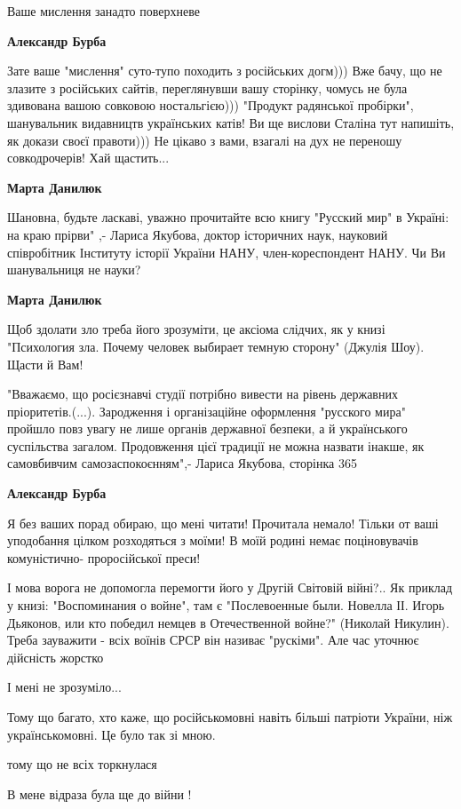 \begin{itemize}
\begin{itemize}
\begin{itemize}
Ваше мислення занадто поверхневе

\textbf{Александр Бурба} 

Зате ваше "мислення" суто-тупо походить з російських догм))) Вже бачу, що не
злазите з російських сайтів, переглянувши вашу сторінку, чомусь не була
здивована вашою совковою ностальгією))) "Продукт радянської пробірки",
шанувальник видавництв українських катів! Ви ще вислови Сталіна тут напишіть,
як докази своєї правоти))) Не цікаво з вами, взагалі на дух не переношу
совкодрочерів! Хай щастить...

\textbf{Марта Данилюк} 

Шановна, будьте ласкаві, уважно прочитайте всю книгу "Русский мир" в Україні:
на краю прірви" ,- Лариса Якубова, доктор історичних наук, науковий
співробітник Інституту історії України НАНУ, член-кореспондент НАНУ. Чи Ви
шанувальниця не науки?


\textbf{Марта Данилюк} 

Щоб здолати зло треба його зрозуміти, це аксіома слідчих, як у книзі
"Психология зла. Почему человек выбирает темную сторону" (Джулія Шоу). Щасти й
Вам!


"Вважаємо, що росієзнавчі студії потрібно вивести на рівень державних
пріоритетів.(...). Зародження і організаційне оформлення "русского мира"
пройшло повз увагу не лише органів державної безпеки, а й українського
суспільства загалом. Продовження цієї традиції не можна назвати інакше, як
самовбивчим самозаспокоєнням",- Лариса Якубова, сторінка 365

\textbf{Александр Бурба} 

Я без ваших порад обираю, що мені читати! Прочитала немало! Тільки от ваші
уподобання цілком розходяться з моїми! В моїй родині немає поціновувачів
комуністично- проросійської преси!

\end{itemize} %


І мова ворога не допомогла перемогти його у Другій Світовій війні?.. Як приклад
у книзі: "Воспоминания о войне", там є "Послевоенные были. Новелла ІІ. Игорь
Дьяконов, или кто победил немцев в Отечественной войне?" (Николай Никулин).
Треба зауважити - всіх воїнів СРСР він називає "рускіми". Але час уточнює
дійсність жорстко

\end{itemize} %


І мені не зрозуміло...

Тому що багато, хто каже, що російськомовні навіть більші патріоти України, ніж українськомовні. Це було так зі мною.

тому що не всіх торкнулася

В мене відраза була ще до війни !

\end{itemize} %
